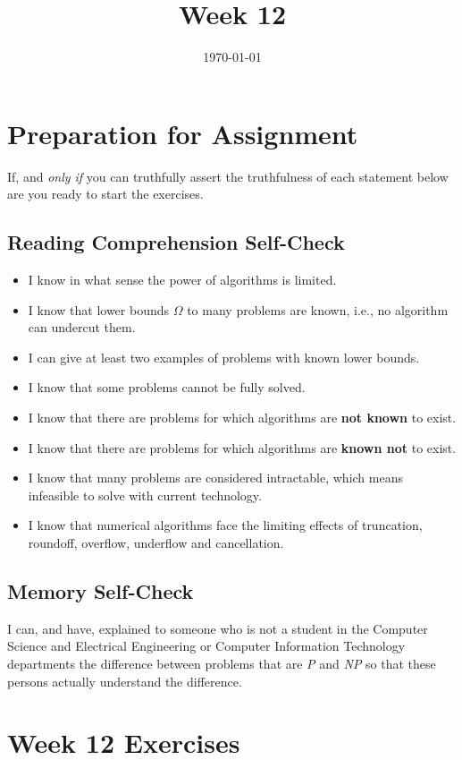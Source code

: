 \documentclass[12pt]{amsart}
\title{Week 12}
\date{\today}
\begin{document}
\maketitle

\section{Preparation for Assignment}
If, and \textit{only if} you can truthfully assert the truthfulness of each statement below are you ready to start the exercises.
\subsection {Reading Comprehension Self-Check}
\begin{itemize}
\item  I know in what sense the power of algorithms is limited.
\item  I know that lower bounds $\Omega$ to many problems are known, i.e., no
    algorithm can undercut them.
\item  I can give at least two examples of problems with known lower bounds.
\item  I know that some problems cannot be fully solved.
\item  I know that there are problems for which algorithms are \textbf{not known} to
    exist.
\item  I know that there are problems for which algorithms are \textbf{known not} to
    exist.
\item  I know that many problems are considered intractable, which means
    infeasible to solve with current technology.
\item  I know that numerical algorithms face the limiting effects of
    truncation, roundoff, overflow, underflow and cancellation.

\end{itemize}
\subsection{Memory Self-Check}
I can, and have, explained to someone who is not a student in the Computer Science and Electrical Engineering or Computer Information Technology departments the difference between problems that are \textit{P} and \textit{NP} so that these persons actually understand the difference. 
 \section{Week 12 Exercises}
\end{document}
